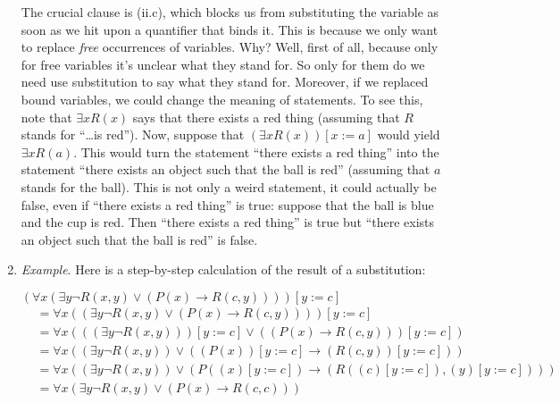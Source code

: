 \begin{enumerate}[\thesection.1]
\begin{enumerate}[(i)]
\begin{enumerate}[(a)]
			\end{enumerate}
	

			\end{enumerate}
			
	The crucial clause is (ii.c), which blocks us from substituting the variable as soon as we hit upon a quantifier that binds it. This is because we only want to replace \emph{free} occurrences of variables. Why? Well, first of all, because only for free variables it's unclear what they stand for. So only for them do we need use substitution to say what they stand for. Moreover, if we replaced bound variables, we could change the meaning of statements. To see this, note that $\exists xR(x)$ says that there exists a red thing (assuming that $R$ stands for ``\dots is red''). Now, suppose that $(\exists xR(x))[x:=a]$ would yield $\exists xR(a)$. This would turn the statement ``there exists a red thing'' into the statement ``there exists an object such that the ball is red'' (assuming that $a$ stands for the ball). This is not only a weird statement, it could actually be false, even if ``there exists a red thing'' is true: suppose that the ball is blue and the cup is red. Then ``there exists a red thing'' is true but ``there exists an object such that the ball is red''  is false. \frownie
	
	\item \emph{Example}. Here is a step-by-step calculation of the result of a substitution: 
	
	$(\forall x(\exists y \neg R(x,y)\lor (P(x)\to R(c,y))))[y:=c]$
	\begin{align*}
	&=\forall x((\exists y \neg R(x,y)\lor (P(x)\to R(c,y))))[y:=c]\\
	&=\forall x(((\exists y \neg R(x,y)))[y:=c]\lor ((P(x)\to R(c,y)))[y:=c])\\
	&=\forall x((\exists y \neg R(x,y))\lor ((P(x))[y:=c]\to (R(c,y))[y:=c]))\\
	&=\forall x((\exists y \neg R(x,y))\lor (P((x)[y:=c])\to (R((c)[y:=c]), (y)[y:=c])))\\
	&=\forall x(\exists y \neg R(x,y)\lor (P(x)\to R(c,c)))
	\end{align*}
	
	
%	
%	
%	
	
	\end{enumerate}
	
